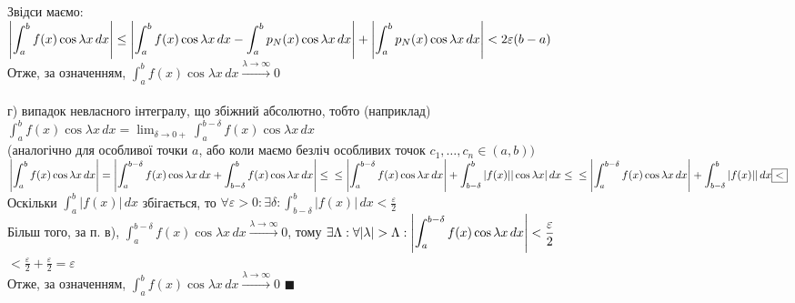\documentclass[a4paper, 10pt]{article}
\def\hugespace{\vspace{5mm} \\}
\theoremstyle{theoremdd}
\theoremstyle{theoremdd}
\theoremstyle{theoremdd}
\theoremstyle{theoremdd}
\theoremstyle{theoremdd}
\theoremstyle{theoremdd}
\theoremstyle{theoremdd}
\theoremstyle{theoremdd}
\begin{document}
Звідси маємо:\\
$\displaystyle \abs{\int_a^b f(x) \cos \lambda x \,dx} \leq \abs{\int_a^b f(x) \cos \lambda x \,dx-\int_a^b p_N(x) \cos \lambda x \,dx} + \abs{\int_a^b p_N(x) \cos \lambda x \,dx} \\ < 2\varepsilon(b-a)$\\
Отже, за означенням, $\displaystyle \int_a^b f(x) \cos \lambda x \,dx \overset{\lambda \to \infty}{\to} 0$\\
\hugespace
г) випадок невласного інтегралу, що збіжний абсолютно, тобто (наприклад) \\ $\displaystyle \int_a^b f(x) \cos \lambda x \,dx = \lim_{\delta \to 0+} \int_a^{b-\delta} f(x) \cos \lambda x \,dx$
\\
(аналогічно для особливої точки $a$, або коли маємо безліч особливих точок $c_1,\dots,c_n \in (a,b))$\\
$\displaystyle \abs{\int_a^b f(x) \cos \lambda x \,dx} = \abs{\int_a^{b-\delta} f(x) \cos \lambda x \,dx + \int_{b-\delta}^b f(x) \cos \lambda x \,dx} \leq \\ \leq \abs{\int_a^{b-\delta} f(x) \cos \lambda x \,dx} + \int_{b-\delta}^b |f(x)| |\cos \lambda x| \,dx \leq \\ \leq \abs{\int_a^{b-\delta} f(x) \cos \lambda x \,dx} + \int_{b-\delta}^b |f(x)| | \,dx \boxed{<}$\\
Оскільки $\displaystyle \int_a^b |f(x)|\,dx$ збігається, то $\displaystyle \forall \varepsilon>0: \exists \delta: \int_{b-\delta}^b |f(x)|\,dx < \frac{\varepsilon}{2}$\\
Більш того, за п. в), $\displaystyle \int_a^{b-\delta} f(x) \cos \lambda x \,dx \overset{\lambda \to \infty}{\to} 0$, тому $\displaystyle \exists \Lambda: \forall |\lambda|>\Lambda: \abs{\int_a^{b-\delta} f(x) \cos \lambda x \,dx} < \frac{\varepsilon}{2}$\\
$\displaystyle \boxed{<} \frac{\varepsilon}{2} + \frac{\varepsilon}{2} = \varepsilon$\\
Отже, за означенням, $\displaystyle \int_a^b f(x) \cos \lambda x \,dx \overset{\lambda \to \infty}{\to} 0$ $\blacksquare$
\hugespace
\end{document}
